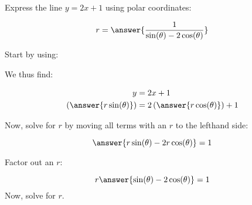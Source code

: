 \documentclass{ximera}
\author{Jim Talamo }
\begin{document}
\begin{exercise}

Express the line $y= 2x+1$ using polar coordinates:

\[
r= \answer{\frac{1}{\sin(\theta) -2  \cos(\theta)} }
\]

\begin{hint}
Start by using:

\begin{multipleChoice}
\end{multipleChoice}

We thus find:

\begin{align*}
y &= 2x+1 \\
\left( \answer{r \sin(\theta)} \right) &= 2\left( \answer{r \cos(\theta)} \right)+1
\end{align*}

Now, solve for $r$ by moving all terms with an $r$ to the lefthand side:

\[
\answer{r \sin(\theta) -2 r \cos(\theta)} =1
\]

Factor out an $r$:

\[
r \answer{ \sin(\theta) -2  \cos(\theta)} =1
\]
Now, solve for $r$.

\end{hint}

\end{exercise}
\end{document}
